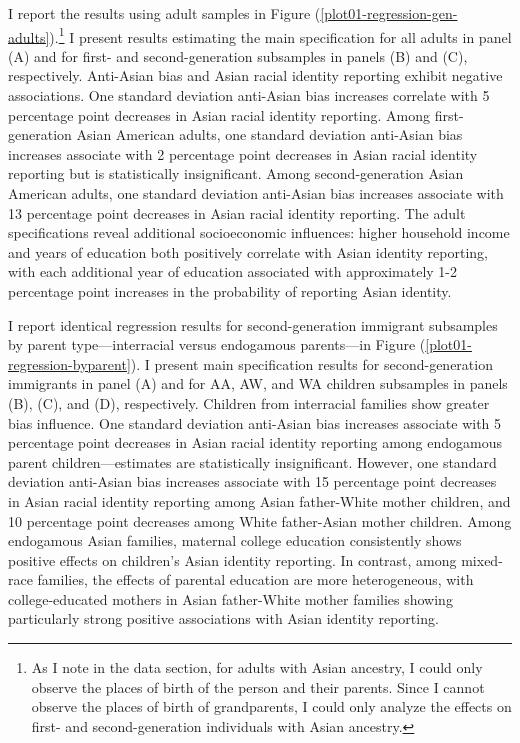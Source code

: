I report the results using adult samples in Figure (\ref{plot01-regression-gen-adults}).\footnote{As I note in the data section, for adults with Asian ancestry, I could only observe the places of birth of the person and their parents. Since I cannot observe the places of birth of grandparents, I could only analyze the effects on first- and second-generation individuals with Asian ancestry.} I present results estimating the main specification for all adults in panel (A) and for first- and second-generation subsamples in panels (B) and (C), respectively. Anti-Asian bias and Asian racial identity reporting exhibit negative associations. One standard deviation anti-Asian bias increases correlate with 5 percentage point decreases in Asian racial identity reporting. Among first-generation Asian American adults, one standard deviation anti-Asian bias increases associate with 2 percentage point decreases in Asian racial identity reporting but is statistically insignificant. Among second-generation Asian American adults, one standard deviation anti-Asian bias increases associate with 13 percentage point decreases in Asian racial identity reporting. The adult specifications reveal additional socioeconomic influences: higher household income and years of education both positively correlate with Asian identity reporting, with each additional year of education associated with approximately 1-2 percentage point increases in the probability of reporting Asian identity.

I report identical regression results for second-generation immigrant subsamples by parent type—interracial versus endogamous parents—in Figure (\ref{plot01-regression-byparent}). I present main specification results for second-generation immigrants in panel (A) and for AA, AW, and WA children subsamples in panels (B), (C), and (D), respectively. Children from interracial families show greater bias influence. One standard deviation anti-Asian bias increases associate with 5 percentage point decreases in Asian racial identity reporting among endogamous parent children—estimates are statistically insignificant. However, one standard deviation anti-Asian bias increases associate with 15 percentage point decreases in Asian racial identity reporting among Asian father-White mother children, and 10 percentage point decreases among White father-Asian mother children. Among endogamous Asian families, maternal college education consistently shows positive effects on children's Asian identity reporting. In contrast, among mixed-race families, the effects of parental education are more heterogeneous, with college-educated mothers in Asian father-White mother families showing particularly strong positive associations with Asian identity reporting.

